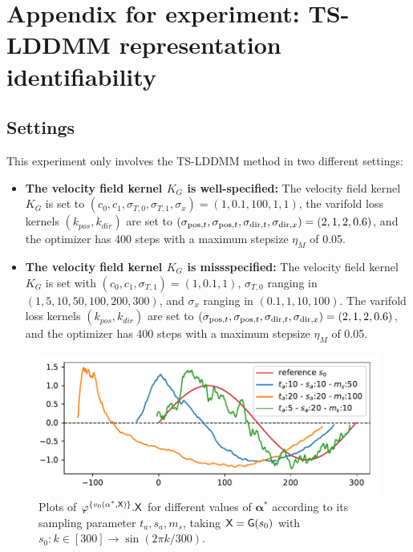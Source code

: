 \section{Appendix for experiment: TS-LDDMM representation identifiability}
\subsection{Settings}
\label{appendix: settings_identifiability}
This experiment only involves the TS-LDDMM method in two different settings: 
\begin{itemize}
  \item \textbf{The velocity field kernel $K_G$ is well-specified:} The velocity field kernel $K_G$ is set to $ (c_0,c_1,\sigma_{T,0},\sigma_{T,1},\sigma_x) = (1,0.1,100,1,1)$, the varifold loss kernels $(k_{pos},k_{dir})$ are set to $(\sigma_{\mathrm{pos},t}, \sigma_{\mathrm{pos},t}, \sigma_{\mathrm{dir},t}, \sigma_{\mathrm{dir},x}) = (2,1,2,0.6)$, and the optimizer has 400 steps with a maximum stepsize $\eta_M$ of 0.05.
  \item \textbf{The velocity field kernel $K_G$ is missspecified:} The velocity field kernel $K_G$ is set with  $(c_0,c_1,\sigma_{T,1}) = (1,0.1,1)$, $\sigma_{T,0}$ ranging in $(1,5,10,50,100,200,300)$, and $\sigma_x$  ranging in $(0.1,1,10,100)$. The varifold loss kernels $(k_{pos},k_{dir})$ are set to $(\sigma_{\mathrm{pos},t}, \sigma_{\mathrm{pos},t}, \sigma_{\mathrm{dir},t}, \sigma_{\mathrm{dir},x}) = (2,1,2,0.6)$, and the optimizer has 400 steps with a maximum stepsize $\eta_M$ of 0.05.
\end{itemize}

\begin{figure}[t]
  \centering
  \includegraphics[width=0.5\linewidth]{pictures/samples.pdf}
  \vspace{-1em}
  \caption{Plots of $\varphi^{\{v_0(\mathbf{\alpha}^*,\mathsf{X})\}}.\mathsf{X}$ for different values of $\mathbf{\alpha}^*$ according to its sampling parameter $t_a,s_a,m_s $, taking $\mathsf{X}=\mathsf{G}(s_0)$ with $s_0:k\in [300]\to \sin(2\pi k/300) $.}
  \label{fig:exemple_synthetic}
  \vspace{-1em}
\end{figure}

